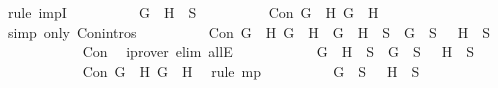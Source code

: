 \begin{isabellebody}
\ {\isacharparenleft}rule\ impI{\isacharparenright}\isanewline
\ \ \ \ \ \ \ \ \isamarkupfalse%
\ {\isachardoublequoteopen}\isactrlbold {\isasymnot}{\isacharparenleft}G\ \isactrlbold {\isasymrightarrow}\ H{\isacharparenright}\ {\isasymin}\ S{\isachardoublequoteclose}\isanewline
\ \ \ \ \ \ \ \ \isamarkupfalse%
\ {\isachardoublequoteopen}Con\ {\isacharparenleft}\isactrlbold {\isasymnot}{\isacharparenleft}G\ \isactrlbold {\isasymrightarrow}\ H{\isacharparenright}{\isacharparenright}\ G\ {\isacharparenleft}\isactrlbold {\isasymnot}\ H{\isacharparenright}{\isachardoublequoteclose}\isanewline
\ \ \ \ \ \ \ \ \ \ \isamarkupfalse%
\ {\isacharparenleft}simp\ only{\isacharcolon}\ Con{\isachardot}intros{\isacharparenleft}{}{\isacharparenright}{\isacharparenright}\isanewline
\ \ \ \ \ \ \ \ \isamarkupfalse%
\ {\isachardoublequoteopen}Con\ {\isacharparenleft}\isactrlbold {\isasymnot}{\isacharparenleft}G\ \isactrlbold {\isasymrightarrow}\ H{\isacharparenright}{\isacharparenright}\ G\ {\isacharparenleft}\isactrlbold {\isasymnot}\ H{\isacharparenright}\ {\isasymlongrightarrow}\ \isactrlbold {\isasymnot}{\isacharparenleft}G\ \isactrlbold {\isasymrightarrow}\ H{\isacharparenright}\ {\isasymin}\ S\ {\isasymlongrightarrow}\ G\ {\isasymin}\ S\ {\isasymand}\ \isactrlbold {\isasymnot}\ H\ {\isasymin}\ S{\isachardoublequoteclose}\isanewline
\ \ \ \ \ \ \ \ \ \ \isamarkupfalse%
\ Con\ \isamarkupfalse%
\ {\isacharparenleft}iprover\ elim{\isacharcolon}\ allE{\isacharparenright}\isanewline
\ \ \ \ \ \ \ \ \isamarkupfalse%
\ \isamarkupfalse%
\ {\isachardoublequoteopen}\isactrlbold {\isasymnot}{\isacharparenleft}G\ \isactrlbold {\isasymrightarrow}\ H{\isacharparenright}\ {\isasymin}\ S\ {\isasymlongrightarrow}\ G\ {\isasymin}\ S\ {\isasymand}\ \isactrlbold {\isasymnot}\ H\ {\isasymin}\ S{\isachardoublequoteclose}\isanewline
\ \ \ \ \ \ \ \ \ \ \isamarkupfalse%
\ {\isacartoucheopen}Con\ {\isacharparenleft}\isactrlbold {\isasymnot}{\isacharparenleft}G\ \isactrlbold {\isasymrightarrow}\ H{\isacharparenright}{\isacharparenright}\ G\ {\isacharparenleft}\isactrlbold {\isasymnot}\ H{\isacharparenright}{\isacartoucheclose}\ \isamarkupfalse%
\ {\isacharparenleft}rule\ mp{\isacharparenright}\isanewline
\ \ \ \ \ \ \ \ \isamarkupfalse%
\ {\isachardoublequoteopen}G\ {\isasymin}\ S\ {\isasymand}\ \isactrlbold {\isasymnot}\ H\ {\isasymin}\ S{\isachardoublequoteclose}\isanewline
\ \ \ \ \ \ \ \ \ \ \isamarkupfalse%

\end{isabellebody}
